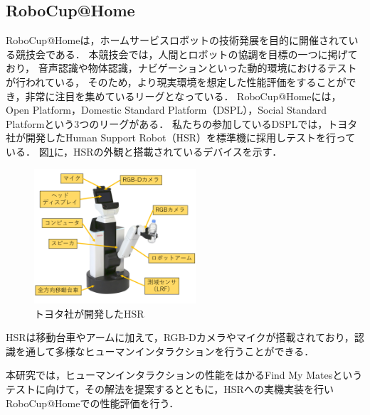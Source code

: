 \documentclass[a4j]{jarticle}
\begin{document}
\subsection{RoboCup@Home}
RoboCup@Homeは，ホームサービスロボットの技術発展を目的に開催されている競技会である．
本競技会では，人間とロボットの協調を目標の一つに掲げており，
音声認識や物体認識，ナビゲーションといった動的環境におけるテストが行われている，
そのため，より現実環境を想定した性能評価をすることができ，非常に注目を集めているリーグとなっている．
RoboCup@Homeには，Open Platform，Domestic Standard Platform（DSPL），Social Standard Platformという3つのリーグがある．
私たちの参加しているDSPLでは，トヨタ社が開発したHuman Support Robot（HSR）を標準機に採用しテストを行っている．
図\ref{overview_hsr}に，HSRの外観と搭載されているデバイスを示す．
\begin{figure}[ht]
  \centering
  \includegraphics[width=6cm]{images/hsr/hsr_explain_ja.png}
  \caption{トヨタ社が開発したHSR}
  \label{overview_hsr}
\end{figure}
HSRは移動台車やアームに加えて，RGB-Dカメラやマイクが搭載されており，認識を通して多様なヒューマンインタラクションを行うことができる．

本研究では，ヒューマンインタラクションの性能をはかるFind My Matesというテストに向けて，その解法を提案するとともに，HSRへの実機実装を行いRoboCup@Homeでの性能評価を行う．
\end{document}
